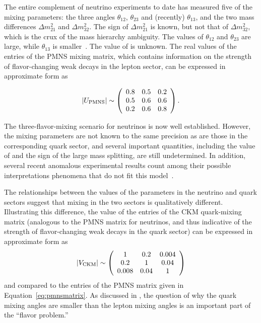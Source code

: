 The entire complement of neutrino experiments to date has measured
five of the mixing parameters: the three angles $\theta_{12}$,
$\theta_{23}$ and (recently) $\theta_{13}$, and the two mass differences
$\Delta m^{2}_{21}$ and $\Delta m^{2}_{32}$. The sign of $\Delta
m^{2}_{21}$ is known, but not that of $\Delta m^{2}_{32}$, which 
is the crux of the 
mass hierarchy ambiguity.
The values of $\theta_{12}$ and $\theta_{23}$ are large, while 
$\theta_{13}$ is smaller~\cite{An:2012bu}. The value of \deltacp is unknown.
The real values of the entries of the PMNS mixing matrix, which
contains information on the strength of flavor-changing weak decays in
the lepton sector, can be expressed in approximate form as

\begin{equation}
|U_{\rm PMNS}|\sim \left(\begin{array}{ccc} 0.8 & 0.5 & 0.2 \\ 0.5 & 0.6 & 0.6 \\ 0.2 & 0.6 & 0.8\end{array} \right).
\label{eq:pmnsmatrix}
\end{equation}


The three-flavor-mixing scenario for neutrinos is now well
established. However, the mixing parameters are not known to the same precision 
as are those in the
corresponding quark sector, and several important quantities, including
the value of \deltacp and the sign of the large mass splitting, are
still undetermined. In addition, several recent
anomalous experimental results count among their possible
interpretations phenomena that do not fit this 
model~\cite{Aguilar:2001ty,AguilarArevalo:2007it,Aguilar-Arevalo:2013pmq,Mention:2011rk}.

The relationships between the values of the parameters in the neutrino
and quark sectors suggest that mixing in the two sectors is
qualitatively different. Illustrating this difference, the value of
the entries of the CKM quark-mixing matrix (analogous to the PMNS matrix for
neutrinos, and thus indicative of the strength of flavor-changing weak
decays in the quark sector) can be expressed in approximate form as
\begin{equation}
|V_{\rm CKM}|\sim \left(\begin{array}{ccc} 1 & 0.2 & 0.004\\ 0.2 & 1 & 0.04 \\ 0.008 & 0.04 & 1\end{array} \right)
\label{eq:ckmmatrix}
\end{equation}
and compared to the entries of the PMNS matrix given in Equation~\ref{eq:pmnsmatrix}.
As discussed in \cite{King:2014nza}, the question of why the quark mixing angles are
smaller than the lepton mixing angles is an important part of the ``flavor problem.''

